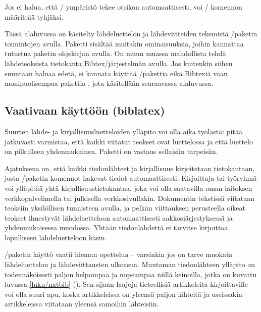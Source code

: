 Jos ei halua, että \-/ ympäristö tekee
otsikon automaattisesti, voi \-/ komennon määrittää
tyhjäksi.

\begin{koodilohkosis}
\renewcommand{\bibsection}{}
\end{koodilohkosis}

\noindent
Tässä alaluvussa on käsitelty lähdeluettelon ja lähdeviitteiden
tekemistä \-/paketin toimintojen avulla. Paketti
sisältää muitakin ominaisuuksia, joihin kannattaa tutustua paketin
ohjekirjan avulla. On muun muassa mahdollista tehdä lähdeteoksista
tietokanta Bibtex\-/järjestelmän avulla. Jos kuitenkin siihen suuntaan
haluaa edetä, ei kannata käyttää \-/pakettia eikä
Bibtexiä vaan monipuolisempaa pakettia , jota
käsitellään seuraavassa alaluvussa.

\subsection{Vaativaan käyttöön (biblatex)}
\label{luku/biblatex}

Suurten lähde- ja kirjallisuusluetteloiden ylläpito voi olla aika
työlästä: pitää jatkuvasti varmistaa, että kaikki viitatut teokset ovat
luettelossa ja että luettelo on pilkulleen yhdenmukainen. Paketti
 on vastaus sellaisiin tarpeisiin.

Ajatuksena on, että kaikki tiedonlähteet ja kirjallisuus kirjoitetaan
tietokantaan, josta \-/paketin komennot hakevat tiedot
automaattisesti. Kirjoittaja tai työryhmä voi ylläpitää yhtä
kirjallisuustietokantaa, joka voi olla saatavilla oman laitoksen
verkkopalvelimella tai julkisella verkkosivullakin. Dokumentin tekstissä
viitataan teoksiin yksilöllisen tunnisteen avulla, ja pelkän viittauksen
perusteella oikeat teokset ilmestyvät lähdeluetteloon automaattisesti
aakkosjärjestyksessä ja yhdenmukaisessa muodossa. Yhtään tiedonlähdettä
ei tarvitse kirjoittaa lopulliseen lähdeluetteloon käsin.

\-/paketin käyttö vaatii hieman opettelua -- varsinkin
jos on tarve muokata lähdeluettelon ja lähdeviittausten ulkoasua.
Muutaman tiedonlähteen ylläpito on todennäköisesti paljon helpompaa ja
nopeampaa niillä keinoilla, jotka on kuvattu luvussa \ref{luku/natbib}
(). Sen sijaan laajoja tieteellisiä artikkeleita
kirjoittaville  voi olla suuri apu, koska
artikkeleissa on yleensä paljon lähteitä ja useissakin artikkeleissa
viitataan yleensä samoihin lähteisiin.

